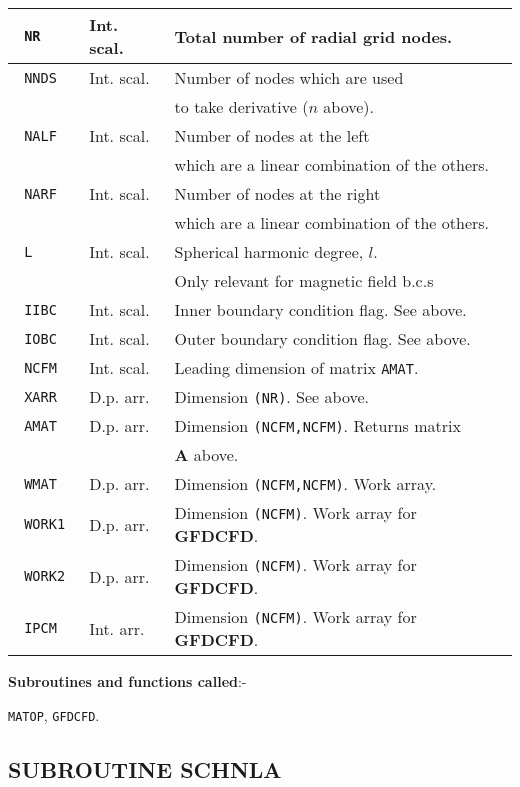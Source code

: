 \begin{tabular}{|l|l|l|}
\hline
\verb+ NR + & Int. scal. & Total number of radial grid nodes. \\
\hline
\verb+ NNDS + & Int. scal. & Number of nodes which are used \\
& & to take derivative ($n$ above). \\
\hline
\verb+ NALF + & Int. scal. & Number of nodes at the left \\
& & which are a linear combination of the others. \\
\hline
\verb+ NARF + & Int. scal. & Number of nodes at the right\\
& & which are a linear combination of the others. \\
\hline
\verb+ L + & Int. scal. & Spherical harmonic degree, $l$. \\
& & Only relevant for magnetic field b.c.s \\
\hline
\verb+ IIBC + & Int. scal. & Inner boundary condition flag. See above. \\
\hline
\verb+ IOBC + & Int. scal. & Outer boundary condition flag. See above. \\
\hline
\verb+ NCFM + & Int. scal. & Leading dimension of matrix \verb+AMAT+. \\
\hline
\verb+ XARR  + & D.p. arr. & Dimension \verb+(NR)+. See above. \\
\hline
\verb+ AMAT + & D.p. arr. & Dimension \verb+(NCFM,NCFM)+. Returns matrix \\
& &  ${\bm A}$ above. \\
\hline
\verb+ WMAT + & D.p. arr. & Dimension \verb+(NCFM,NCFM)+. Work array. \\
\hline
\verb+ WORK1 + & D.p. arr. & Dimension \verb+(NCFM)+. Work array
for {\bf GFDCFD}. \\
\hline
\verb+ WORK2 + & D.p. arr. & Dimension \verb+(NCFM)+. Work array
for {\bf GFDCFD}. \\
\hline
\verb+ IPCM + & Int. arr. & Dimension \verb+(NCFM)+. Work array
for {\bf GFDCFD}. \\
\hline
\end{tabular} \newline

{\bf Subroutines and functions called}:- \newline

\verb+MATOP+, \verb+GFDCFD+.

\subsection{SUBROUTINE SCHNLA}
\label{sec:schnlainfo}

